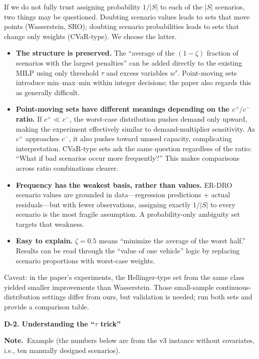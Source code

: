 \documentclass[10pt,a4paper]{article}
\newcommand{\note}{\textbf{Note.}\ }
\begin{document}
If we do not fully trust assigning probability $1/|S|$ to each of the $|S|$ scenarios, two things may be questioned. Doubting scenario values leads to sets that move points (Wasserstein, SRO); doubting scenario probabilities leads to sets that change only weights (CVaR-type). We choose the latter.
\begin{itemize}
\item \textbf{The structure is preserved.} The ``average of the $(1-\zeta)$ fraction of scenarios with the largest penalties'' can be added directly to the existing MILP using only threshold $\tau$ and excess variables $w^s$. Point-moving sets introduce min--max--min within integer decisions; the paper also regards this as generally difficult.
\item \textbf{Point-moving sets have different meanings depending on the $c^+/c^-$ ratio.} If $c^+\ll c^-$, the worst-case distribution pushes demand only upward, making the experiment effectively similar to demand-multiplier sensitivity. As $c^+$ approaches $c^-$, it also pushes toward unused capacity, complicating interpretation. CVaR-type sets ask the same question regardless of the ratio: ``What if bad scenarios occur more frequently?'' This makes comparisons across ratio combinations clearer.
\item \textbf{Frequency has the weakest basis, rather than values.} ER-DRO scenario values are grounded in data---regression predictions + actual residuals---but with fewer observations, assigning exactly $1/|S|$ to every scenario is the most fragile assumption. A probability-only ambiguity set targets that weakness.
\item \textbf{Easy to explain.} $\zeta=0.5$ means ``minimize the average of the worst half.'' Results can be read through the ``value of one vehicle'' logic by replacing scenario proportions with worst-case weights.
\end{itemize}
Caveat: in the paper's experiments, the Hellinger-type set from the same class yielded smaller improvements than Wasserstein. Those small-sample continuous-distribution settings differ from ours, but validation is needed; run both sets and provide a comparison table.

\textbf{D-2. Understanding the ``$\tau$ trick''}

\note Example (the numbers below are from the v3 instance without covariates, i.e., ten manually designed scenarios).
\end{document}
